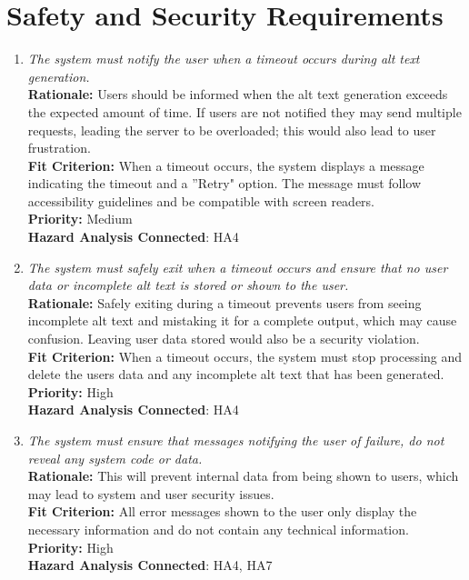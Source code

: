 \documentclass{article}
\begin{document}
\section{Safety and Security Requirements}
\begin{enumerate}[label=PR-SR-HA \arabic*., wide=0pt, leftmargin=*]
  \item \emph{The system must notify the user when a timeout occurs during alt text generation.}\\[2mm]
    {\bf Rationale:} Users should be informed when the alt text generation exceeds the expected amount of time. If users are not notified they may send multiple requests, leading the server to be overloaded; this would also lead to user frustration.\\
    {\bf Fit Criterion:} When a timeout occurs, the system displays a message indicating the timeout and a ''Retry" option. The message must follow accessibility guidelines and be compatible with screen readers.\\
    {\bf Priority:} Medium\\
    {\bf Hazard Analysis Connected}: HA4
  \item \emph{The system must safely exit when a timeout occurs and ensure that no user data or incomplete alt text is stored or shown to the user.}\\[2mm]
    {\bf Rationale:} Safely exiting during a timeout prevents users from seeing incomplete alt text and mistaking it for a complete output, which may cause confusion. Leaving user data stored would also be a security violation. \\
    {\bf Fit Criterion:} When a timeout occurs, the system must stop processing and delete the users data and any incomplete alt text that has been generated.\\
    {\bf Priority:} High\\
    {\bf Hazard Analysis Connected}: HA4
  \item \emph{The system must ensure that messages notifying the user of failure, do not reveal any system code or data. }\\[2mm]
    {\bf Rationale:} This will prevent internal data from being shown to users, which may lead to system and user security issues. \\
    {\bf Fit Criterion:} All error messages shown to the user only display the necessary information and do not contain any technical information.\\
    {\bf Priority:} High \\
    {\bf Hazard Analysis Connected}: HA4, HA7
\end{enumerate}
\end{document}
